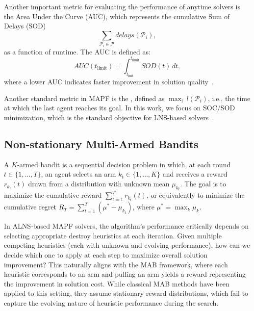 \documentclass[review]{jair}
\begin{document}
Another important metric for evaluating the performance of anytime solvers is the Area Under the Curve (AUC), which represents the cumulative Sum of Delays (SOD) 
\begin{equation}
\sum_{\mathcal{P}_i \in \mathcal{P}} delays(\mathcal{P}_i),
\end{equation}
as a function of runtime. The AUC is defined as:
\begin{equation}
AUC(t_{\text{limit}}) = \int_{t_{\text{init}}}^{t_{\text{limit}}} SOD(t) \, dt,
\end{equation}
where a lower AUC indicates faster improvement in solution quality~\citep{ML-LNS}.

Another standard metric in MAPF is the , defined as $\max_i\, l(\mathcal{P}_i)$, i.e., the time at which the last agent reaches its goal. In this work, we focus on SOC/SOD minimization, which is the standard objective for LNS-based solvers~\citep{LNS, LNS2}.


\subsection{Non-stationary Multi-Armed Bandits}
A $K$-armed bandit is a sequential decision problem in which, at each round $t \in \{1, \ldots, T\}$, an agent selects an arm $k_t \in \{1, \ldots, K\}$ and receives a reward $r_{k_t}(t)$ drawn from a distribution with unknown mean $\mu_{k_t}$. The goal is to maximize the cumulative reward $\sum_{t=1}^T r_{k_t}(t)$, or equivalently to minimize the cumulative regret $R_T = \sum_{t=1}^T (\mu^* - \mu_{k_t})$, where $\mu^* = \max_k \mu_k$.

In ALNS-based MAPF solvers, the algorithm's performance critically depends on selecting appropriate destroy heuristics at each iteration. Given multiple competing heuristics (each with unknown and evolving performance), how can we decide which one to apply at each step to maximize overall solution improvement? This naturally aligns with the MAB framework, where each heuristic corresponds to an arm and pulling an arm yields a reward representing the improvement in solution cost. While classical MAB methods have been applied to this setting, they assume stationary reward distributions, which fail to capture the evolving nature of heuristic performance during the search.
\end{document}
